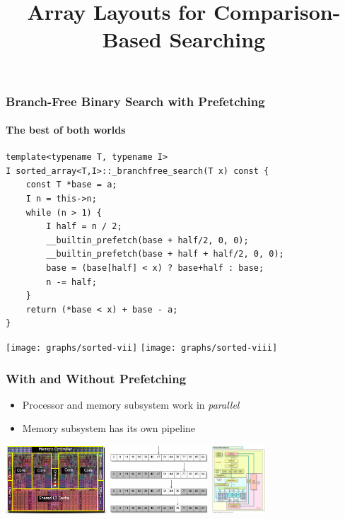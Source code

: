 \documentclass[xcolor=dvipsnames]{beamer}
\begin{document}
\begin{frame}[fragile]
   \frametitle{Branch-Free Binary Search with Prefetching}
   \framesubtitle{The best of both worlds}

   {\tiny
   \begin{verbatim}
template<typename T, typename I>
I sorted_array<T,I>::_branchfree_search(T x) const {
    const T *base = a;
    I n = this->n;
    while (n > 1) {
        I half = n / 2;
        __builtin_prefetch(base + half/2, 0, 0);
        __builtin_prefetch(base + half + half/2, 0, 0);
        base = (base[half] < x) ? base+half : base;
        n -= half;
    }
    return (*base < x) + base - a;
}
   \end{verbatim}
   }
   \texttt{[image: graphs/sorted-vii]}
   \texttt{[image: graphs/sorted-viii]}

\end{frame}

\begin{frame}[fragile]
   \frametitle{With and Without Prefetching}

   \begin{center}
   \end{center}
   \begin{itemize}[<+->]
     \item Processor and memory subsystem work in \emph{parallel}
     \item Memory subsystem has its own pipeline
   \end{itemize}
\end{frame}

\begin{frame}
  \title{Array Layouts for Comparison-Based Searching}
  \titlepage
  \centerline{
    \includegraphics[height=1in]{images/nehalemdie}
    \includegraphics[height=1in]{images/binary-search}
    \includegraphics[height=1in]{images/nehalem-block}
  }
\end{frame}
\end{document}
